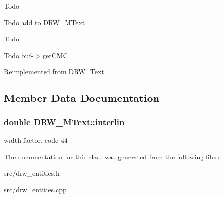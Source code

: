 \begin{DoxyRefDesc}{Todo}
\item[\hyperlink{todo__todo000003}{Todo}]add to \hyperlink{class_d_r_w___m_text}{D\+R\+W\+\_\+\+M\+Text} \end{DoxyRefDesc}


\begin{DoxyRefDesc}{Todo}
\item[\hyperlink{todo__todo000004}{Todo}]buf-\/$>$get\+C\+M\+C \end{DoxyRefDesc}


Reimplemented from \hyperlink{class_d_r_w___text}{D\+R\+W\+\_\+\+Text}.



\subsection{Member Data Documentation}
\hypertarget{class_d_r_w___m_text_a60c7259ea36123406c5270dcd5434efa}{}
\subsubsection[{interlin}]{\setlength{\rightskip}{0pt plus 5cm}double D\+R\+W\+\_\+\+M\+Text\+::interlin}\label{class_d_r_w___m_text_a60c7259ea36123406c5270dcd5434efa}
width factor, code 44 

The documentation for this class was generated from the following files\+:\begin{DoxyCompactItemize}
\item 
src/drw\+\_\+entities.\+h\item 
src/drw\+\_\+entities.\+cpp\end{DoxyCompactItemize}
